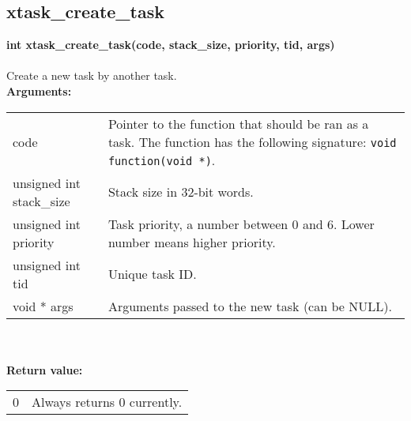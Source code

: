 \begin{samepage}
\subsection{xtask\_create\_task}
\noindent
\textbf{int xtask\_create\_task(code, stack\_size, priority, tid, args)}\\\\
Create a new task by another task.\\

\noindent
\textbf{Arguments:}\\
\indent\begin{tabular}{ p{4.5cm}  p{9cm} }
code                     & Pointer to the function that should be ran as a task.
                           The function has the following signature: 
                           \verb|void function(void *)|.\\
unsigned int stack\_size & Stack size in 32-bit words.\\
unsigned int priority    & Task priority, a number between 0 and 6. Lower number
                           means higher priority.\\
unsigned int tid         & Unique task ID.\\
void * args              & Arguments passed to the new task (can be NULL).
\end{tabular}\\\\

\noindent
\textbf{Return value:}\\
\indent\begin{tabular}{  p{4.5cm}  p{9cm} }
0 & Always returns 0 currently. \\
\end{tabular}
\end{samepage}

